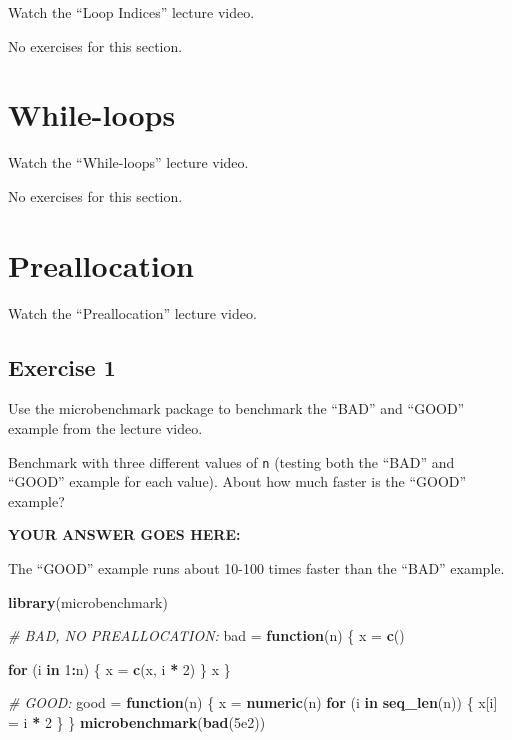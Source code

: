 \documentclass[
]{article}
\newenvironment{Shaded}{\begin{snugshade}}{\end{snugshade}}
\newcommand{\CommentTok}[1]{\textcolor[rgb]{0.56,0.35,0.01}{\textit{#1}}}
\newcommand{\ControlFlowTok}[1]{\textcolor[rgb]{0.13,0.29,0.53}{\textbf{#1}}}
\newcommand{\DecValTok}[1]{\textcolor[rgb]{0.00,0.00,0.81}{#1}}
\newcommand{\FloatTok}[1]{\textcolor[rgb]{0.00,0.00,0.81}{#1}}
\newcommand{\KeywordTok}[1]{\textcolor[rgb]{0.13,0.29,0.53}{\textbf{#1}}}
\newcommand{\NormalTok}[1]{#1}
\newcommand{\OperatorTok}[1]{\textcolor[rgb]{0.81,0.36,0.00}{\textbf{#1}}}
\newcommand{\StringTok}[1]{\textcolor[rgb]{0.31,0.60,0.02}{#1}}
\begin{document}
Watch the ``Loop Indices'' lecture video.

No exercises for this section.

\hypertarget{while-loops}{%
\section{While-loops}\label{while-loops}}

Watch the ``While-loops'' lecture video.

No exercises for this section.

\hypertarget{preallocation}{%
\section{Preallocation}\label{preallocation}}

Watch the ``Preallocation'' lecture video.

\hypertarget{exercise-1}{%
\subsection{Exercise 1}\label{exercise-1}}

Use the microbenchmark package to benchmark the ``BAD'' and ``GOOD''
example from the lecture video.

Benchmark with three different values of \texttt{n} (testing both the
``BAD'' and ``GOOD'' example for each value). About how much faster is
the ``GOOD'' example?

\textbf{YOUR ANSWER GOES HERE:}

The ``GOOD'' example runs about 10-100 times faster than the ``BAD''
example.

\begin{Shaded}
\begin{Highlighting}[]
\KeywordTok{library}\NormalTok{(microbenchmark)}

\CommentTok{\# BAD, NO PREALLOCATION:}
\NormalTok{bad =}\StringTok{ }\ControlFlowTok{function}\NormalTok{(n) \{}
\NormalTok{   x =}\StringTok{ }\KeywordTok{c}\NormalTok{()}

   \ControlFlowTok{for}\NormalTok{ (i }\ControlFlowTok{in} \DecValTok{1}\OperatorTok{:}\NormalTok{n) \{}
\NormalTok{   x =}\StringTok{ }\KeywordTok{c}\NormalTok{(x, i }\OperatorTok{*}\StringTok{ }\DecValTok{2}\NormalTok{)}
\NormalTok{   \}}
\NormalTok{   x}
\NormalTok{\}}

\CommentTok{\# GOOD:}
\NormalTok{good =}\StringTok{ }\ControlFlowTok{function}\NormalTok{(n) \{}
\NormalTok{   x =}\StringTok{ }\KeywordTok{numeric}\NormalTok{(n)}
   \ControlFlowTok{for}\NormalTok{ (i }\ControlFlowTok{in} \KeywordTok{seq\_len}\NormalTok{(n)) \{}
\NormalTok{   x[i] =}\StringTok{ }\NormalTok{i }\OperatorTok{*}\StringTok{ }\DecValTok{2}
\NormalTok{   \}}
\NormalTok{\}}
\KeywordTok{microbenchmark}\NormalTok{(}\KeywordTok{bad}\NormalTok{(}\FloatTok{5e2}\NormalTok{))}
\end{Highlighting}
\end{Shaded}
\end{document}
